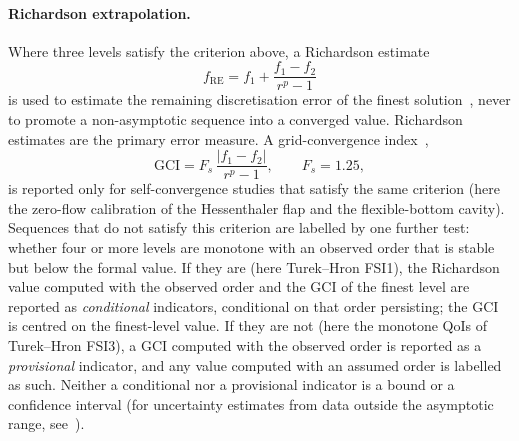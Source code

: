 \paragraph{Richardson extrapolation.}
Where three levels satisfy the criterion above, a Richardson estimate
\begin{equation}
	f_\mathrm{RE} = f_1 + \frac{f_1 - f_2}{r^{p} - 1}
	\label{eq:richardson}
\end{equation}
is used to estimate the remaining discretisation error of the finest solution~\citep{Richardson1911, Roache1998}, never to promote a non-asymptotic sequence into a converged value.
Richardson estimates are the primary error measure.
A grid-convergence index~\citep{Roache1994, Roache1998, Celik2008},
\begin{equation}
	\mathrm{GCI} = F_s\,\frac{|f_1 - f_2|}{r^{p} - 1}, \qquad F_s = 1.25,
	\label{eq:gci}
\end{equation}
is reported only for self-convergence studies that satisfy the same criterion (here the zero-flow calibration of the Hessenthaler flap and the flexible-bottom cavity). Sequences that do not satisfy this criterion are labelled by one further test: whether four or more levels are monotone with an observed order that is stable but below the formal value.
If they are (here Turek--Hron FSI1), the Richardson value computed with the observed order and the GCI of the finest level are reported as \emph{conditional} indicators, conditional on that order persisting; the GCI is centred on the finest-level value.
If they are not (here the monotone QoIs of Turek--Hron FSI3), a GCI computed with the observed order is reported as a \emph{provisional} indicator, and any value computed with an assumed order is labelled as such.
Neither a conditional nor a provisional indicator is a bound or a confidence interval (for uncertainty estimates from data outside the asymptotic range, see~\citet{Eca2014}).

